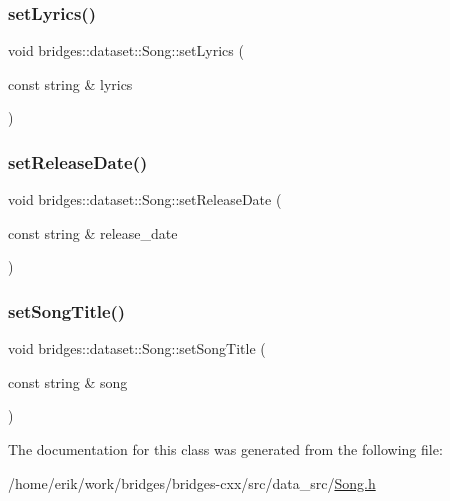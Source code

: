 \mbox{\label{classbridges_1_1dataset_1_1_song_a1ec794f19e791366b9af9df132d4a4b5}} 
\subsubsection{\texorpdfstring{set\+Lyrics()}{setLyrics()}}
{\footnotesize\ttfamily void bridges\+::dataset\+::\+Song\+::set\+Lyrics (\begin{DoxyParamCaption}\item[{const string \&}]{lyrics }\end{DoxyParamCaption})\hspace{0.3cm}{\ttfamily [inline]}}

\mbox{\label{classbridges_1_1dataset_1_1_song_ab40e43ae94ffc57d2f036769d807a144}} 
\subsubsection{\texorpdfstring{set\+Release\+Date()}{setReleaseDate()}}
{\footnotesize\ttfamily void bridges\+::dataset\+::\+Song\+::set\+Release\+Date (\begin{DoxyParamCaption}\item[{const string \&}]{release\+\_\+date }\end{DoxyParamCaption})\hspace{0.3cm}{\ttfamily [inline]}}

\mbox{\label{classbridges_1_1dataset_1_1_song_aa707a5a8905585643893b6c71bf5e299}} 
\subsubsection{\texorpdfstring{set\+Song\+Title()}{setSongTitle()}}
{\footnotesize\ttfamily void bridges\+::dataset\+::\+Song\+::set\+Song\+Title (\begin{DoxyParamCaption}\item[{const string \&}]{song }\end{DoxyParamCaption})\hspace{0.3cm}{\ttfamily [inline]}}



The documentation for this class was generated from the following file\+:\begin{DoxyCompactItemize}
\item 
/home/erik/work/bridges/bridges-\/cxx/src/data\+\_\+src/\hyperlink{_song_8h}{Song.\+h}\end{DoxyCompactItemize}
